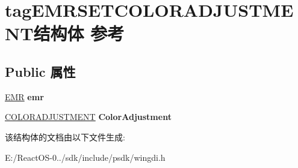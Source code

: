 \hypertarget{structtag_e_m_r_s_e_t_c_o_l_o_r_a_d_j_u_s_t_m_e_n_t}{}\section{tag\+E\+M\+R\+S\+E\+T\+C\+O\+L\+O\+R\+A\+D\+J\+U\+S\+T\+M\+E\+N\+T结构体 参考}
\label{structtag_e_m_r_s_e_t_c_o_l_o_r_a_d_j_u_s_t_m_e_n_t}
\subsection*{Public 属性}
\begin{DoxyCompactItemize}
\item 
\mbox{\label{structtag_e_m_r_s_e_t_c_o_l_o_r_a_d_j_u_s_t_m_e_n_t_afc94e2e2855ea1995ad893786f1edc51}} 
\hyperlink{structtag_e_m_r}{E\+MR} {\bfseries emr}
\item 
\mbox{\label{structtag_e_m_r_s_e_t_c_o_l_o_r_a_d_j_u_s_t_m_e_n_t_a06c0378bdedc2cac0d5d15c597556074}} 
\hyperlink{structtag_c_o_l_o_r_a_d_j_u_s_t_m_e_n_t}{C\+O\+L\+O\+R\+A\+D\+J\+U\+S\+T\+M\+E\+NT} {\bfseries Color\+Adjustment}
\end{DoxyCompactItemize}


该结构体的文档由以下文件生成\+:\begin{DoxyCompactItemize}
\item 
E\+:/\+React\+O\+S-\/0../sdk/include/psdk/wingdi.\+h\end{DoxyCompactItemize}

